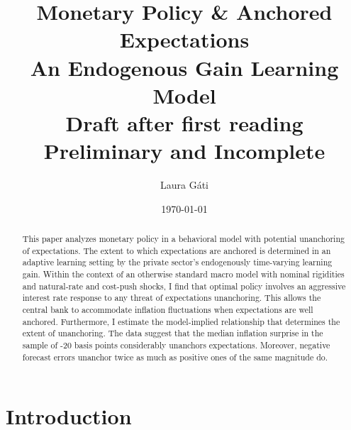\documentclass[11pt]{article}
\renewcommand{\[}{\begin{equation}}
\renewcommand{\]}{\end{equation}}
\def\movepibar{5 }
\def\movei{12 }
\begin{document}
\title{Monetary Policy \& Anchored Expectations \\
An Endogenous Gain Learning Model \\
\vspace{0.8cm}
\small{Draft after first reading \\ Preliminary and Incomplete}}
\author{Laura G\'ati} 
\date{\today}
\maketitle


\begin{abstract}
This paper analyzes monetary policy in a behavioral model with potential unanchoring of expectations. The extent to which expectations are anchored is determined in an adaptive learning setting by the private sector's endogenously time-varying learning gain. Within the context of an otherwise standard macro model with nominal rigidities and natural-rate and cost-push shocks, I find that optimal policy involves an aggressive interest rate response to any threat of expectations unanchoring. This allows the central bank to accommodate inflation fluctuations when expectations are well anchored. Furthermore, I estimate the model-implied relationship that determines the extent of unanchoring. The data suggest that the median inflation surprise in the sample of -20 basis points considerably unanchors expectations. Moreover, negative forecast errors unanchor twice as much as positive ones of the same magnitude do. 
\end{abstract}





\newpage
\section{Introduction}\label{introduction}
\end{document}
